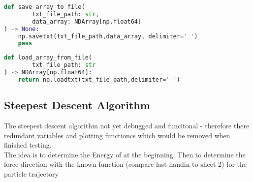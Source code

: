 \documentclass{article}
\begin{document}
\begin{lstlisting}[language=Python, caption=This is a function that saves an array to a file.]
def save_array_to_file(
        txt_file_path: str,
        data_array: NDArray[np.float64]
) -> None:
    np.savetxt(txt_file_path,data_array, delimiter=' ')
    pass
\end{lstlisting}


\begin{lstlisting}[language=Python, caption=This function loads saved positions from a files.]
def load_array_from_file(
        txt_file_path: str
) -> NDArray[np.float64]:
    return np.loadtxt(txt_file_path,delimiter=' ')
\end{lstlisting}

\subsection{Steepest Descent Algorithm}

The steepest descent algorithm not yet debugged and funcitonal - therefore there redundant variables and plotting functioncs which would be removed when finished testing. \\
The idea is to determine the Energy of at the beginning. Then to determine the force direction with the known function (compare last handin to sheet 2) for the particle trajectory
\end{document}
